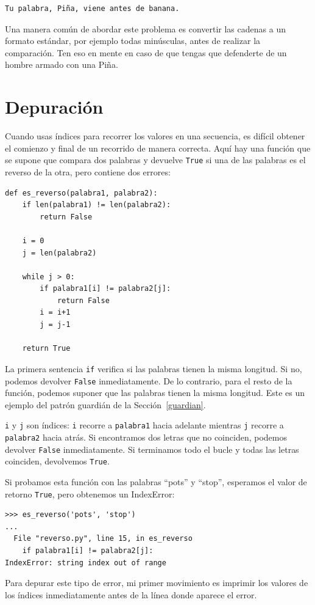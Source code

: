 \documentclass[10pt]{book}
\begin{document}
\begin{verbatim}
Tu palabra, Piña, viene antes de banana.
\end{verbatim}
%
Una manera común de abordar este problema es convertir las cadenas a un
formato estándar, por ejemplo todas minúsculas, antes de realizar
la comparación.  Ten eso en mente en caso de que tengas que defenderte
de un hombre armado con una Piña.


\section{Depuración}

Cuando usas índices para recorrer los valores en una secuencia,
es difícil obtener el comienzo y final de un recorrido
de manera correcta.  Aquí hay una función que se supone que compara dos
palabras y devuelve {\tt True} si una de las palabras es el reverso
de la otra, pero contiene dos errores:

\begin{verbatim}
def es_reverso(palabra1, palabra2):
    if len(palabra1) != len(palabra2):
        return False

    i = 0
    j = len(palabra2)

    while j > 0:
        if palabra1[i] != palabra2[j]:
            return False
        i = i+1
        j = j-1

    return True
\end{verbatim}
%
La primera sentencia {\tt if} verifica si las palabras tienen la
misma longitud.  Si no, podemos devolver {\tt False} inmediatamente.
De lo contrario, para el resto de la función, podemos suponer que las palabras
tienen la misma longitud.  Este es un ejemplo del patrón guardián
de la Sección~\ref{guardian}.

{\tt i} y {\tt j} son índices: {\tt i} recorre a {\tt palabra1}
hacia adelante mientras {\tt j} recorre a {\tt palabra2} hacia atrás.  Si encontramos
dos letras que no coinciden, podemos devolver {\tt False} inmediatamente.
Si terminamos todo el bucle y todas las letras coinciden,
devolvemos {\tt True}.

Si probamos esta función con las palabras ``pots'' y ``stop'',
esperamos el valor de retorno {\tt True}, pero obtenemos un IndexError:

\begin{verbatim}
>>> es_reverso('pots', 'stop')
...
  File "reverso.py", line 15, in es_reverso
    if palabra1[i] != palabra2[j]:
IndexError: string index out of range
\end{verbatim}
%
Para depurar este tipo de error, mi primer movimiento es
imprimir los valores de los índices inmediatamente antes de la línea
donde aparece el error.
\end{document}
